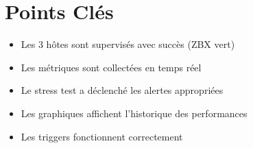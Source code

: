 \section{Points Clés}

\begin{itemize}
    \item[$\checkmark$] Les 3 hôtes sont supervisés avec succès (ZBX vert)
    \item[$\checkmark$] Les métriques sont collectées en temps réel
    \item[$\checkmark$] Le stress test a déclenché les alertes appropriées
    \item[$\checkmark$] Les graphiques affichent l'historique des performances
    \item[$\checkmark$] Les triggers fonctionnent correctement
\end{itemize}
